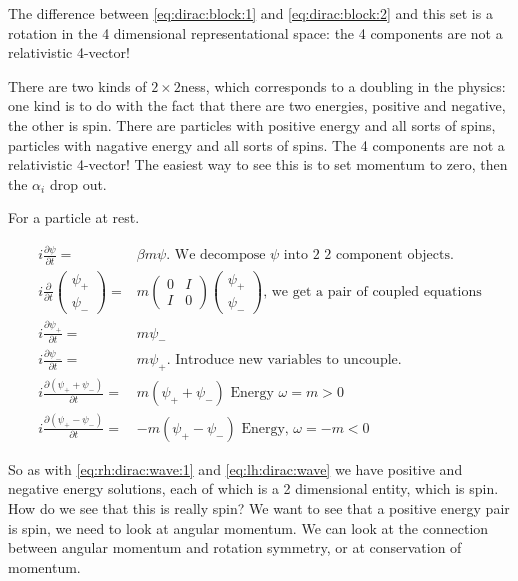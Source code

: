 \documentclass[]{article}
\begin{document}
The difference between \eqref{eq:dirac:block:1} and \eqref{eq:dirac:block:2} and this set is a rotation in the 4 dimensional representational space: the 4 components are not a relativistic 4-vector!

There are two kinds of $2\times2$ness, which corresponds to a doubling in the physics: one kind is to do with the fact that there are two energies, positive and negative, the other is spin. There are particles with positive energy and all sorts of spins, particles with nagative energy and all sorts of spins.
The 4 components are not a relativistic 4-vector! The easiest way to see this is to set momentum to zero, then the $\alpha_i$ drop out.

For a particle at rest.

\begin{align*}
	i \frac{\partial \psi}{\partial t} =&  \beta m \psi \text{. We decompose $\psi$ into 2 2 component objects.}\\
	i \frac{\partial}{\partial t}\begin{pmatrix}
		\psi_+\\
		\psi_-
	\end{pmatrix}=&m \begin{pmatrix}
		0&I\\
		I&0
	\end{pmatrix}\begin{pmatrix}
		\psi_+\\
		\psi_-
	\end{pmatrix} \text{, we get a pair of coupled equations}\\
	i \frac{\partial \psi_+}{\partial t} =&   m \psi_-\\
	i \frac{\partial \psi_-}{\partial t} =&   m \psi_+ \text{. Introduce new variables to uncouple.}\\
	i \frac{\partial (\psi_++\psi_-)}{\partial t} =&   m (\psi_++\psi_-) \text{ Energy $\omega=m>0$}\\
	i \frac{\partial (\psi_+-\psi_-)}{\partial t} =&   -m (\psi_+-\psi_-) \text{ Energy, $\omega=-m<0$}
\end{align*}

So as with \eqref{eq:rh:dirac:wave:1} and \eqref{eq:lh:dirac:wave} we have positive and negative energy solutions, each of which is a 2 dimensional entity, which is spin. How do we see that this is really spin? We want to see that a positive energy pair is spin, we need to look at angular momentum. We can look at the connection between angular momentum and rotation symmetry, or at conservation of momentum.
\end{document}
